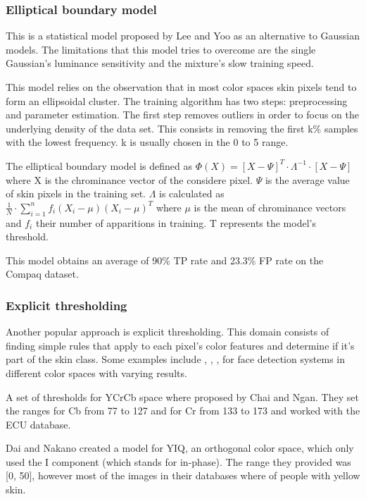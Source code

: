 \documentclass[12pt]{report}
\begin{document}
	\subsubsection{Elliptical boundary model}
	This is a statistical model proposed by Lee and Yoo\cite{gaussian_applied} as an alternative to Gaussian models. The limitations that this model tries to overcome are the single Gaussian's luminance sensitivity and the mixture's slow training speed.
	
	This model relies on the observation\cite{Yang99gaussianmixture} that in most color spaces skin pixels tend to form an ellipsoidal cluster. The training algorithm has two steps: preprocessing and parameter estimation. The first step removes outliers in order to focus on the underlying density of the data set. This consists in removing the first k\% samples with the lowest frequency. k is usually chosen in the 0 to 5 range.
	
	The elliptical boundary model is defined as $ \Phi(X) = [X - \Psi]^T\cdot \Lambda^{-1} \cdot [X - \Psi]  $ where X is the chrominance vector of the considere pixel. $\Psi$ is the average value of skin pixels in the training set. $\Lambda$ is calculated as $ \frac{1}{N} \cdot \sum_{i=1}^{n}f_i(X_i-\mu)(X_i-\mu)^T$ where $\mu$ is the mean of chrominance vectors and $f_i$ their number of apparitions in training. T represents the model's threshold.
	
	This model obtains an average of 90\% TP rate and 23.3\% FP rate on the Compaq dataset.
	
	\subsubsection{Explicit thresholding}
	Another popular approach is explicit thresholding. This domain consists of finding simple rules that apply to each pixel's color features and determine if it's part of the skin class. Some examples include \cite{rgb_threshold}, \cite{cr_cb_threshold}, \cite{yiq_threshold}, \cite{i_threshold} for face detection systems in different color spaces with varying results. 
 	
 	A set of thresholds for YCrCb space where proposed by Chai and Ngan\cite{cr_cb_threshold}. They set the ranges for Cb from 77 to 127 and for Cr from 133 to 173 and worked with the ECU database.
 	
 	Dai and Nakano\cite{yiq_threshold} created a model for YIQ, an orthogonal color space, which only used the I component (which stands for in-phase). The range they provided was [0, 50], however most of the images in their databases where of people with yellow skin.
 	
\end{document}
